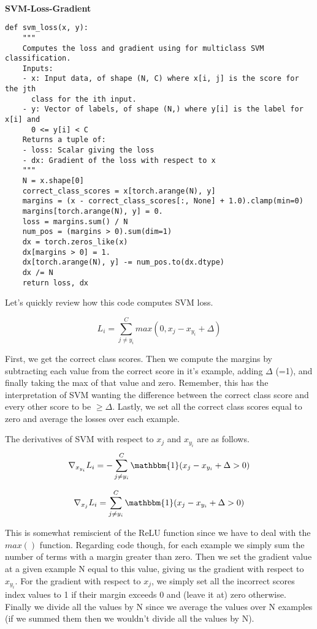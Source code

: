 \documentclass[12pt]{article}
\begin{document}
\paragraph{}
\textbf{SVM-Loss-Gradient}
\begin{verbatim}
def svm_loss(x, y):
    """
    Computes the loss and gradient using for multiclass SVM classification.
    Inputs:
    - x: Input data, of shape (N, C) where x[i, j] is the score for the jth
      class for the ith input.
    - y: Vector of labels, of shape (N,) where y[i] is the label for x[i] and
      0 <= y[i] < C
    Returns a tuple of:
    - loss: Scalar giving the loss
    - dx: Gradient of the loss with respect to x
    """
    N = x.shape[0]
    correct_class_scores = x[torch.arange(N), y]
    margins = (x - correct_class_scores[:, None] + 1.0).clamp(min=0)
    margins[torch.arange(N), y] = 0.
    loss = margins.sum() / N
    num_pos = (margins > 0).sum(dim=1)
    dx = torch.zeros_like(x)
    dx[margins > 0] = 1.
    dx[torch.arange(N), y] -= num_pos.to(dx.dtype)
    dx /= N
    return loss, dx
\end{verbatim}

Let's quickly review how this code computes SVM loss. 

\begin{equation}
    L_{i} = \sum_{j \neq y_{i}}^C max(0, x_{j} - x_{y_{i}} + \Delta)
\end{equation}

First, we get the correct class scores. Then we compute the margins by 
subtracting each value from the correct score in it's example, 
adding $\Delta$ (=1), and finally taking the max of that value and zero. 
Remember, this has the interpretation of SVM wanting the difference between 
the correct class score and every other score to be $\geq \Delta$. Lastly, 
we set all the correct class scores equal to zero and average the losses 
over each example. 

The derivatives of SVM with respect to $x_j$ and $x_{y_i}$ are as follows. 
\begin{equation}
    \nabla_{x_{y_i}} L_i = -\sum_{j \neq y_i}^C \mathbbm{1}
        (x_j - x_{y_i} + \Delta > 0)
\end{equation}

\begin{equation}
    \nabla_{x_j} L_i = \sum_{j \neq y_i}^C \mathbbm{1}
        (x_j - x_{y_i} + \Delta > 0)
\end{equation}

This is somewhat remiscient of the ReLU function since we have to deal with the 
$max()$ function. Regarding code though, for each example we simply sum the number of terms 
with a margin greater than zero. Then we set the gradient value at a given example N
equal to this value, giving us the gradient with respect to $x_{y_i}$. For the gradient
with respect to $x_j$, we simply set all the incorrect scores index values to 1 if their
margin exceeds 0 and (leave it at) zero otherwise. Finally we divide all the values by 
N since we average the values over N examples (if we summed them then we wouldn't divide
all the values by N). 
\end{document}
